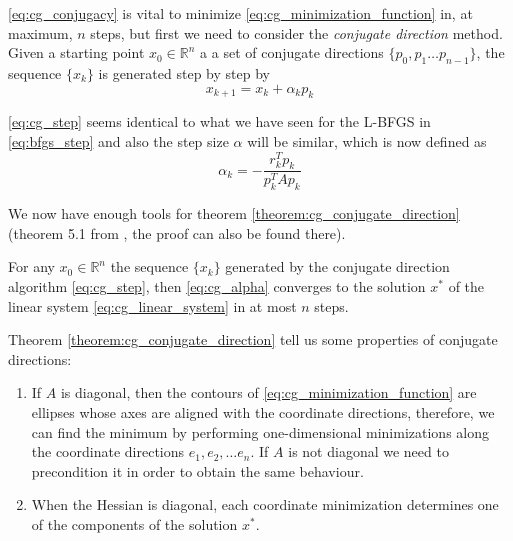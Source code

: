 \noindent \eqref{eq:cg_conjugacy} is vital to minimize \eqref{eq:cg_minimization_function} in, at maximum, $n$ steps, but first we need to consider the \textit{conjugate direction} method. Given a starting point $x_0 \in \mathbb{R}^n$ a a set of conjugate directions $\{ p_0, p_1 \dots p_{n-1}\}$, the sequence $\{ x_k\}$ is generated step by step by
\begin{equation}
    x_{k+1} = x_k + \alpha_kp_k
    \label{eq:cg_step}
\end{equation}

\noindent \eqref{eq:cg_step} seems identical to what we have seen for the L-BFGS in \eqref{eq:bfgs_step} and also the step size $\alpha$ will be similar, which is now defined as
\begin{equation}
    \alpha_k = -\frac{r_k^Tp_k}{p_k^TAp_k}
    \label{eq:cg_alpha}
\end{equation}

\noindent We now have enough tools for theorem \ref{theorem:cg_conjugate_direction} (theorem 5.1 from \cite{nocedal1999numerical}, the proof can also be found there).
\begin{theorem}
    For any $x_0 \in \mathbb{R}^n$ the sequence $\{ x_k\}$ generated by the conjugate direction algorithm \eqref{eq:cg_step}, then \eqref{eq:cg_alpha} converges to the solution $x^*$ of the linear system \eqref{eq:cg_linear_system} in at most $n$ steps.
    \label{theorem:cg_conjugate_direction}
\end{theorem}

\noindent Theorem \ref{theorem:cg_conjugate_direction} tell us some properties of conjugate directions:
\begin{enumerate}
    \item If $A$ is diagonal, then the contours of \eqref{eq:cg_minimization_function} are ellipses whose axes are aligned with the coordinate directions, therefore, we can find the minimum by performing one-dimensional minimizations along the coordinate directions $e_1, e_2, \dots e_n$. If $A$ is not diagonal we need to precondition it in order to obtain the same behaviour.
    \item When the Hessian is diagonal, each coordinate minimization determines one of the components of the solution $x^*$.
\end{enumerate}

